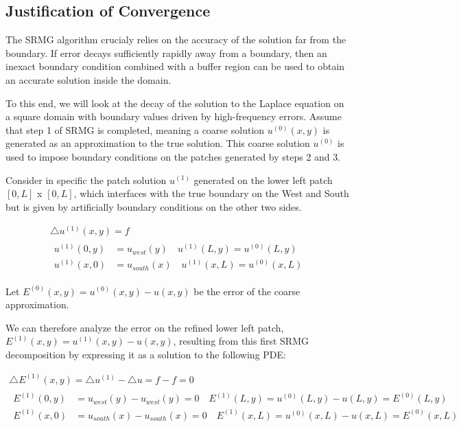 \documentclass[final]{siamart1116}
\numberwithin{theorem}{section}
\begin{document}
\subsection{Justification of Convergence}\label{sec:firstanalysis}

The SRMG algorithm crucialy relies on the accuracy of the solution far from the boundary. If error decays sufficiently
rapidly away from a boundary, then an inexact boundary condition combined with a buffer region can be used to obtain an
accurate solution inside the domain. 

To this end, we will look at the decay of the solution to the Laplace equation on a square domain with boundary values driven by high-frequency errors. Assume that step 1 of SRMG is completed, meaning a coarse solution  $u^{(0)}(x, y)$ is generated as an approximation to the true solution. This coarse solution $u^{(0)}$ is used to impose boundary conditions on the patches generated by steps 2 and 3. 

Consider in specific the patch solution $u^{(1)}$ generated on the lower left patch $[0, L]$ x $[0, L]$, which interfaces with the true boundary on the West and South but is given by artificially boundary conditions  on the other two sides. 

\begin{gather}
  \bigtriangleup  u^{(1)}(x,y) = f  \\
  \begin{split}
    u^{(1)}(0,y) &= u_{west}(y) \quad u^{(1)}(L,y) = u^{(0)}(L, y) \\
    u^{(1)}(x,0) &= u_{south}(x) \quad u^{(1)}(x,L) = u^{(0)}(x, L) \nonumber
  \end{split}
\end{gather}

Let $E^{(0)}(x, y) = u^{(0)}(x, y) - u(x, y)$ be the error of the coarse approximation. 

We can therefore analyze the error on the refined lower left patch, $E^{(1)}(x, y) = u^{(1)}(x, y) - u(x, y)$, resulting from this first SRMG decomposition by expressing it as a solution to the following PDE: 

\begin{gather}
  \bigtriangleup  {E}^{(1)}(x,y) = \bigtriangleup u^{(1)} - \bigtriangleup u = f - f = 0 \\
  \begin{split}
    {E}^{(1)}(0,y) &= u_{west}(y) - u_{west}(y) = 0 \quad {E}^{(1)}(L,y) = u^{(0)}(L, y) - u(L, y) = E^{(0)}(L, y) \\
    {E}^{(1)} (x,0) &= u_{south}(x) - u_{south}(x) = 0 \quad E^{(1)}(x,L) = u^{(0)}(x, L) - u(x, L)  = E^{(0)}(x, L) \nonumber 
  \end{split}
\end{gather}
\end{document}
